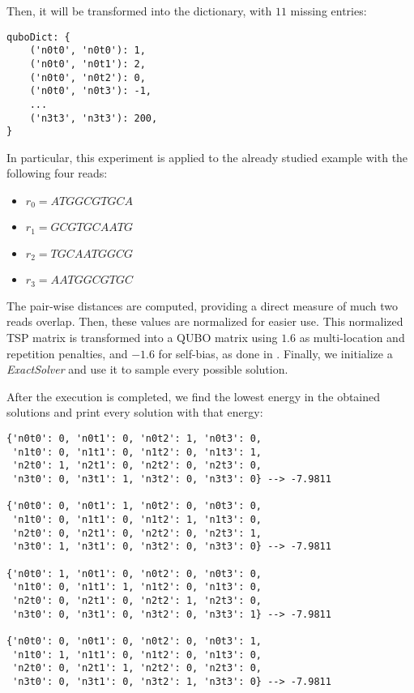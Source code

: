 Then, it will be transformed into the dictionary, with $11$ missing entries: 

\begin{verbatim}
quboDict: {
	('n0t0', 'n0t0'): 1,
	('n0t0', 'n0t1'): 2,
	('n0t0', 'n0t2'): 0,
	('n0t0', 'n0t3'): -1,
	...
	('n3t3', 'n3t3'): 200,
}
\end{verbatim}

In particular, this experiment is applied to the already studied example with the following four reads:

\begin{itemize}
	\item $r_0 = ATGGCGTGCA$
	\item $r_1 = GCGTGCAATG$
	\item $r_2 = TGCAATGGCG$
	\item $r_3 = AATGGCGTGC$
\end{itemize}

The pair-wise distances are computed, providing a direct measure of much two reads overlap. Then, these values are normalized for easier use. This normalized TSP matrix is transformed into a QUBO matrix using $1.6$ as multi-location and repetition penalties, and $-1.6$ for self-bias, as done in \cite{Sarkar2020}. Finally, we initialize a \emph{ExactSolver} and use it to sample every possible solution.

After the execution is completed, we find the lowest energy in the obtained solutions and print every solution with that energy:

\begin{verbatim}
{'n0t0': 0, 'n0t1': 0, 'n0t2': 1, 'n0t3': 0,
 'n1t0': 0, 'n1t1': 0, 'n1t2': 0, 'n1t3': 1,
 'n2t0': 1, 'n2t1': 0, 'n2t2': 0, 'n2t3': 0,
 'n3t0': 0, 'n3t1': 1, 'n3t2': 0, 'n3t3': 0} --> -7.9811

{'n0t0': 0, 'n0t1': 1, 'n0t2': 0, 'n0t3': 0,
 'n1t0': 0, 'n1t1': 0, 'n1t2': 1, 'n1t3': 0, 
 'n2t0': 0, 'n2t1': 0, 'n2t2': 0, 'n2t3': 1, 
 'n3t0': 1, 'n3t1': 0, 'n3t2': 0, 'n3t3': 0} --> -7.9811

{'n0t0': 1, 'n0t1': 0, 'n0t2': 0, 'n0t3': 0,
 'n1t0': 0, 'n1t1': 1, 'n1t2': 0, 'n1t3': 0, 
 'n2t0': 0, 'n2t1': 0, 'n2t2': 1, 'n2t3': 0, 
 'n3t0': 0, 'n3t1': 0, 'n3t2': 0, 'n3t3': 1} --> -7.9811

{'n0t0': 0, 'n0t1': 0, 'n0t2': 0, 'n0t3': 1,
 'n1t0': 1, 'n1t1': 0, 'n1t2': 0, 'n1t3': 0,
 'n2t0': 0, 'n2t1': 1, 'n2t2': 0, 'n2t3': 0,
 'n3t0': 0, 'n3t1': 0, 'n3t2': 1, 'n3t3': 0} --> -7.9811
\end{verbatim}

